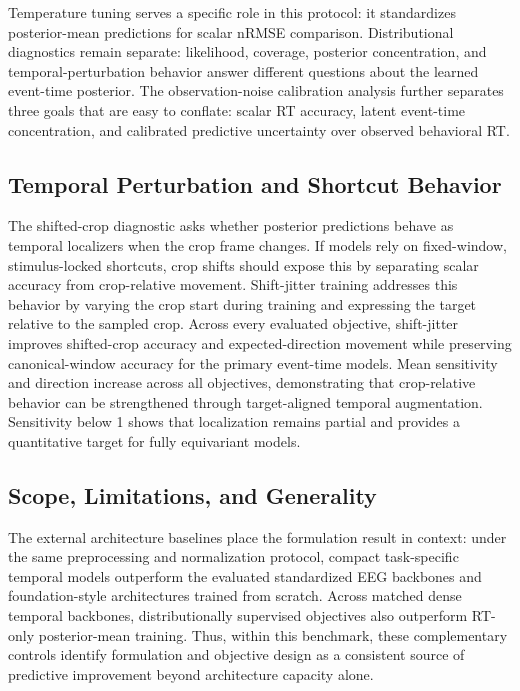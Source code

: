 \documentclass[12pt]{article}
\begin{document}
Temperature tuning serves a specific role in this protocol: it standardizes posterior-mean predictions for scalar nRMSE comparison. Distributional diagnostics remain separate: likelihood, coverage, posterior concentration, and temporal-perturbation behavior answer different questions about the learned event-time posterior. The observation-noise calibration analysis further separates three goals that are easy to conflate: scalar RT accuracy, latent event-time concentration, and calibrated predictive uncertainty over observed behavioral RT.

\subsection{Temporal Perturbation and Shortcut Behavior}

The shifted-crop diagnostic asks whether posterior predictions behave as temporal localizers when the crop frame changes. If models rely on fixed-window, stimulus-locked shortcuts, crop shifts should expose this by separating scalar accuracy from crop-relative movement. Shift-jitter training addresses this behavior by varying the crop start during training and expressing the target relative to the sampled crop. Across every evaluated objective, shift-jitter improves shifted-crop accuracy and expected-direction movement while preserving canonical-window accuracy for the primary event-time models. Mean sensitivity and direction increase across all objectives, demonstrating that crop-relative behavior can be strengthened through target-aligned temporal augmentation. Sensitivity below 1 shows that localization remains partial and provides a quantitative target for fully equivariant models.

\subsection{Scope, Limitations, and Generality}

The external architecture baselines place the formulation result in context: under the same preprocessing and normalization protocol, compact task-specific temporal models outperform the evaluated standardized EEG backbones and foundation-style architectures trained from scratch. Across matched dense temporal backbones, distributionally supervised objectives also outperform RT-only posterior-mean training. Thus, within this benchmark, these complementary controls identify formulation and objective design as a consistent source of predictive improvement beyond architecture capacity alone.
\end{document}
